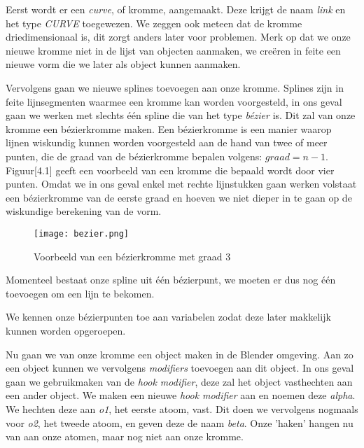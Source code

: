 

Eerst wordt er een \textit{curve}, of kromme,  aangemaakt. Deze krijgt de naam \textit{link} en het type \textit{CURVE} toegewezen. We zeggen ook meteen dat de kromme driedimensionaal is, dit zorgt anders later voor problemen. Merk op dat we onze nieuwe kromme niet in de lijst van objecten aanmaken, we creëren in feite een nieuwe vorm die we later als object kunnen aanmaken. 


Vervolgens gaan we nieuwe splines toevoegen aan onze kromme. Splines zijn in feite lijnsegmenten waarmee een kromme kan worden voorgesteld, in ons geval gaan we werken met slechts één spline die van het type \textit{bézier} is. Dit zal van onze kromme een bézierkromme maken. Een bézierkromme is een manier waarop lijnen wiskundig kunnen worden voorgesteld aan de hand van twee of meer punten, die de graad van de 	bézierkromme bepalen volgens: $graad = n - 1$. Figuur[4.1] geeft een voorbeeld van een kromme die bepaald wordt door vier punten. Omdat we in ons geval enkel met rechte lijnstukken gaan werken volstaat een bézierkromme van de eerste graad en hoeven we niet dieper in te gaan op de wiskundige berekening van de vorm.

\begin{figure}[H]
\begin{center}
\texttt{[image: bezier.png]}
\caption{Voorbeeld van een bézierkromme met graad 3 \citep*{BEZ1}}
\end{center}
\end{figure}

Momenteel bestaat onze spline uit één bézierpunt, we moeten er dus nog één toevoegen om een lijn te bekomen.



We kennen onze bézierpunten toe aan variabelen zodat deze later makkelijk kunnen worden opgeroepen.



Nu gaan we van onze kromme een object maken in de Blender omgeving. Aan zo een object kunnen we vervolgens \textit{modifiers} toevoegen aan dit object. In ons geval gaan we gebruikmaken van de \textit{hook modifier}, deze zal het object vasthechten aan een ander object. We maken een nieuwe \textit{hook modifier} aan en noemen deze \textit{alpha}. We hechten deze aan \textit{o1}, het eerste atoom, vast. Dit doen we vervolgens nogmaals voor \textit{o2}, het tweede atoom, en geven deze de naam \textit{beta}. Onze 'haken' hangen nu van aan onze atomen, maar nog niet aan onze kromme.

